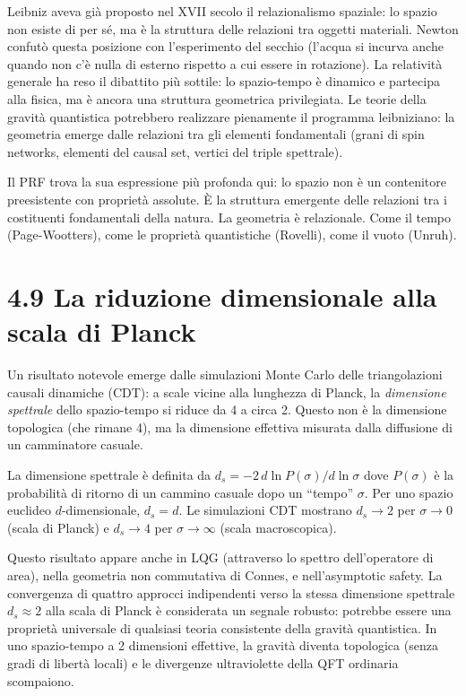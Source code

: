 \documentclass[11.5pt,a4paper,openany]{book}
\theoremstyle{remark}
\begin{document}
Leibniz aveva già proposto nel XVII secolo il relazionalismo spaziale: lo spazio non esiste di per sé, ma è la struttura delle relazioni tra oggetti materiali. Newton confutò questa posizione con l'esperimento del secchio (l'acqua si incurva anche quando non c'è nulla di esterno rispetto a cui essere in rotazione). La relatività generale ha reso il dibattito più sottile: lo spazio-tempo è dinamico e partecipa alla fisica, ma è ancora una struttura geometrica privilegiata. Le teorie della gravità quantistica potrebbero realizzare pienamente il programma leibniziano: la geometria emerge dalle relazioni tra gli elementi fondamentali (grani di spin networks, elementi del causal set, vertici del triple spettrale).

Il PRF trova la sua espressione più profonda qui: lo spazio non è un contenitore preesistente con proprietà assolute. È la struttura emergente delle relazioni tra i costituenti fondamentali della natura. La geometria è relazionale. Come il tempo (Page-Wootters), come le proprietà quantistiche (Rovelli), come il vuoto (Unruh).

\section{4.9 La riduzione dimensionale alla scala di Planck}

Un risultato notevole emerge dalle simulazioni Monte Carlo delle triangolazioni causali dinamiche (CDT): a scale vicine alla lunghezza di Planck, la \textit{dimensione spettrale} dello spazio-tempo si riduce da 4 a circa 2. Questo non è la dimensione topologica (che rimane 4), ma la dimensione effettiva misurata dalla diffusione di un camminatore casuale.

La dimensione spettrale è definita da $d_s = -2\,d\ln P(\sigma)/d\ln\sigma$ dove $P(\sigma)$ è la probabilità di ritorno di un cammino casuale dopo un ``tempo'' $\sigma$. Per uno spazio euclideo $d$-dimensionale, $d_s = d$. Le simulazioni CDT mostrano $d_s \to 2$ per $\sigma \to 0$ (scala di Planck) e $d_s \to 4$ per $\sigma \to \infty$ (scala macroscopica).

Questo risultato appare anche in LQG (attraverso lo spettro dell'operatore di area), nella geometria non commutativa di Connes, e nell'asymptotic safety. La convergenza di quattro approcci indipendenti verso la stessa dimensione spettrale $d_s \approx 2$ alla scala di Planck è considerata un segnale robusto: potrebbe essere una proprietà universale di qualsiasi teoria consistente della gravità quantistica. In uno spazio-tempo a 2 dimensioni effettive, la gravità diventa topologica (senza gradi di libertà locali) e le divergenze ultraviolette della QFT ordinaria scompaiono.
\end{document}

